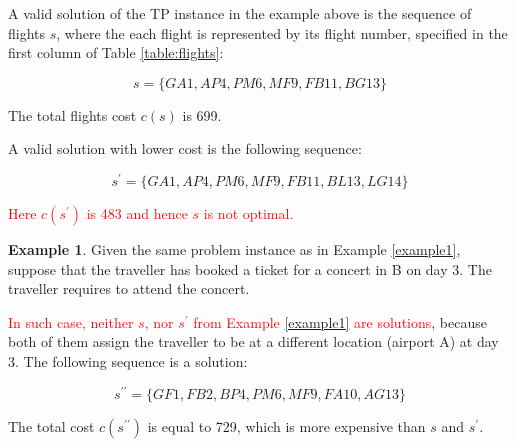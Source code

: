 \documentclass{article}
\theoremstyle{definition}
\newtheorem{example}{Example}
\begin{document}
\begin{solution}
A valid solution of the TP instance in the example above is the sequence of flights $s$, where the each flight is represented by its flight number, specified in the first column of Table \ref{table:flights}:

$$ s = \{GA1, AP4, PM6, MF9, FB11, BG13\} $$

The total flights cost $c(s)$ is 699.

A valid solution with lower cost is the following sequence:

$$ s^{\prime} = \{GA1, AP4, PM6, MF9, FB11, BL13, LG14\} $$

\textcolor{red}{Here $c(s^{\prime})$ is 483 and hence $s$ is not optimal.}
\end{solution}

\begin{example}
\label{example2}
Given the same problem instance as in Example \ref{example1}, suppose that the traveller has booked a ticket for a concert in B on day 3. The traveller requires to attend the concert.
\end{example}

\begin{solution}
\textcolor{red}{In such case, neither $s$, nor $s^{\prime}$ from Example \ref{example1} are solutions}, because both of them assign the traveller to be at a different location (airport A) at day 3. The following sequence is a solution:

$$ s^{\prime\prime} = \{GF1, FB2, BP4, PM6, MF9, FA10, AG13\} $$

The total cost $c(s^{\prime\prime})$ is equal to 729, which is more expensive than $s$ and $s^{\prime}$.
\end{solution}





\end{document}
